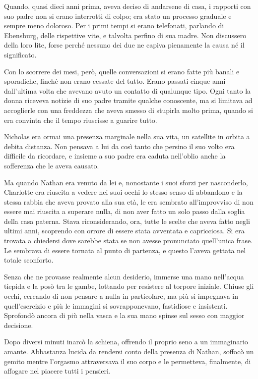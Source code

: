 \documentclass[a4paper,oneside,11pt]{memoir}
\begin{document}
Quando, quasi dieci anni prima, aveva deciso di andarsene di casa, i rapporti
con suo padre non si erano interrotti di colpo; era stato un processo graduale e
sempre meno doloroso. Per i primi tempi si erano telefonati, parlando di
Ebensburg, delle rispettive vite, e talvolta perfino di sua madre. Non
discussero della loro lite, forse perché nessuno dei due ne capiva pienamente la
causa né il significato.

Con lo scorrere dei mesi, però, quelle conversazioni si erano fatte più banali e
sporadiche, finché non erano cessate del tutto. Erano passati cinque anni
dall'ultima volta che avevano avuto un contatto di qualunque tipo. Ogni tanto la
donna riceveva notizie di suo padre tramite qualche conoscente, ma si limitava
ad accoglierle con una freddezza che aveva smesso di stupirla molto prima,
quando si era convinta che il tempo riuscisse a guarire tutto.

Nicholas era ormai una presenza marginale nella sua vita, un satellite in orbita
a debita distanza. Non pensava a lui da così tanto che persino il suo volto era
difficile da ricordare, e insieme a suo padre era caduta nell'oblio anche la
sofferenza che le aveva causato.

Ma quando Nathan era venuto da lei e, nonostante i suoi sforzi per nasconderlo,
Charlotte era riuscita a vedere nei suoi occhi lo stesso senso di abbandono e la
stessa rabbia che aveva provato alla sua età, le era sembrato all'improvviso di
non essere mai riuscita a superare nulla, di non aver fatto un solo passo dalla
soglia della casa paterna. Stava riconsiderando, ora, tutte le scelte che aveva
fatto negli ultimi anni, scoprendo con orrore di essere stata avventata e
capricciosa. Si era trovata a chiedersi dove sarebbe stata se non avesse
pronunciato quell'unica frase. Le sembrava di essere tornata al punto di
partenza, e questo l'aveva gettata nel totale sconforto.

Senza che ne provasse realmente alcun desiderio, immerse una mano nell'acqua
tiepida e la posò tra le gambe, lottando per resistere al torpore iniziale.
Chiuse gli occhi, cercando di non pensare a nulla in particolare, ma più si
impegnava in quell'esercizio e più le immagini si sovrapponevano, fastidiose e
insistenti. Sprofondò ancora di più nella vasca e la sua mano spinse sul sesso
con maggior decisione.

Dopo diversi minuti inarcò la schiena, offrendo il proprio seno a un immaginario
amante. Abbastanza lucida da rendersi conto della presenza di Nathan, soffocò un
gemito mentre l'orgasmo attraversava il suo corpo e le permetteva, finalmente,
di affogare nel piacere tutti i pensieri.
\end{document}
